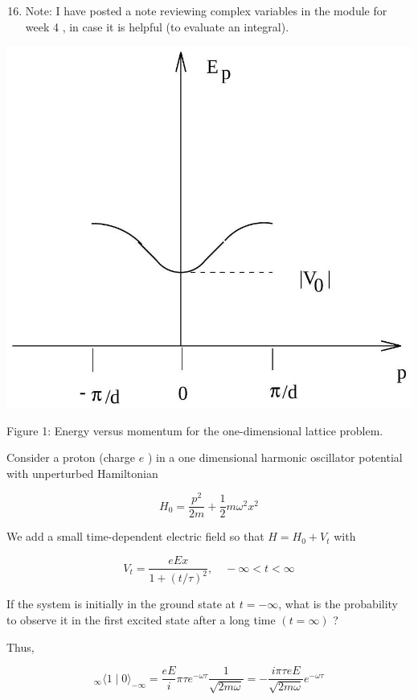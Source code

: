 \documentclass[12pt]{article}
\begin{document}
\begin{enumerate}
  \setcounter{enumi}{15}
  \item Note: I have posted a note reviewing complex variables in the module for week 4 , in case it is helpful (to evaluate an integral).
\end{enumerate}

\begin{center}
\includegraphics[max width=\textwidth]{2024_01_29_bd91e6d395035e9decbag-3}
\end{center}

Figure 1: Energy versus momentum for the one-dimensional lattice problem.

Consider a proton (charge $e$ ) in a one dimensional harmonic oscillator potential with unperturbed Hamiltonian

$$
H_{0}=\frac{p^{2}}{2 m}+\frac{1}{2} m \omega^{2} x^{2}
$$

We add a small time-dependent electric field so that $H=H_{0}+V_{t}$ with

$$
V_{t}=\frac{e E x}{1+(t / \tau)^{2}}, \quad-\infty<t<\infty
$$

If the system is initially in the ground state at $t=-\infty$, what is the probability to observe it in the first excited state after a long time $(t=\infty)$ ?

Thus,

$$
{ }_{\infty}\langle 1 \mid 0\rangle_{-\infty}=\frac{e E}{i} \pi \tau e^{-\omega \tau} \frac{1}{\sqrt{2 m \omega}}=-\frac{i \pi \tau e E}{\sqrt{2 m \omega}} e^{-\omega \tau}
$$
\end{document}
